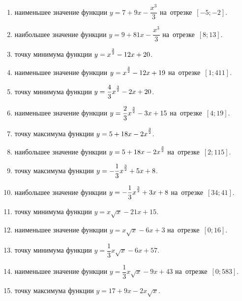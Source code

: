 \documentclass[a4paper,10pt]{article}
\begin{document}
\begin{enumerate}
\item {} наименьшее значение функции $y=7 +9x-\dfrac{x^3}{3}$ на~отрезке~$\left[-5;-2\right]$.

\item {} наибольшее значение функции $y=9 +81x-\dfrac{x^3}{3}$ на~отрезке~$\left[8;13\right]$.

\item {} точку минимума функции $y=x\strut^{\frac{3}{2}} -12x+20$.

\item {} наименьшее значение функции $y=x\strut^{\frac{3}{2}} -12x+19$ на~отрезке~$\left[1;411\right]$.

\item {} точку минимума функции $y=\dfrac{4}{3}x\strut^{\frac{3}{2}} -2x+20$.

\item {} наименьшее значение функции $y=\dfrac{2}{3}x\strut^{\frac{3}{2}} -3x+15$ на~отрезке~$\left[4;19\right]$.

\item {} точку максимума функции $y=5+18x-2x\strut^{\frac{3}{2}}$.

\item {} наибольшее значение функции $y=5+18x-2x\strut^{\frac{3}{2}}$ на~отрезке~$\left[2;115\right]$.

\item {} точку максимума функции $y=-\dfrac{1}{3}x\strut^{\frac{3}{2}} +5x+8$.

\item {} наибольшее значение функции $y=-\dfrac{1}{3}x\strut^{\frac{3}{2}} +3x+8$ на~отрезке~$\left[34;41\right]$.

\item {} точку минимума функции $y=x\sqrt{x} -21x+15$.

\item {} наименьшее значение функции $y=x\sqrt{x} -6x+3$ на~отрезке~$\left[0;16\right]$.

\item {} точку минимума функции $y=\dfrac{1}{3}x\sqrt{x} -6x+57$.

\item {} наименьшее значение функции $y=\dfrac{1}{3}x\sqrt{x} -9x+43$ на~отрезке~$\left[0;583\right]$.

\item {} точку максимума функции $y=17+9x -2x\sqrt{x}$.


\end{enumerate}
\end{document}
